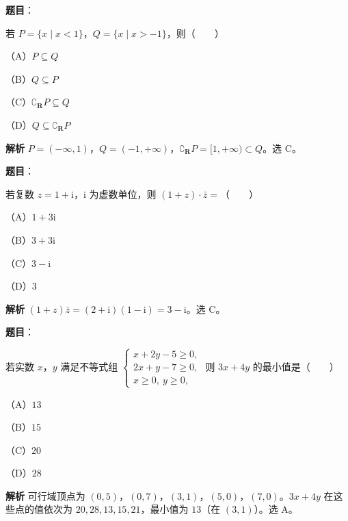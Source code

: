 
\begin{answer}

\textbf{题目}：

若 $P=\{x\mid x<1\}$，$Q=\{x\mid x>-1\}$，则\mbox{（　　）}

（A）$P\subseteq Q$

（B）$Q\subseteq P$

（C）$\complement_{\mathbf R}P\subseteq Q$

（D）$Q\subseteq\complement_{\mathbf R}P$

\textbf{解析}
$P=(-\infty,1)$，$Q=(-1,+\infty)$，$\complement_{\mathbf R}P=[1,+\infty)\subset Q$。选 C。


\end{answer}
\begin{answer}

\textbf{题目}：

若复数 $z=1+\mathrm i$，$\mathrm i$ 为虚数单位，则 $(1+z)\cdot\bar z=$\mbox{（　　）}

（A）$1+3\mathrm i$

（B）$3+3\mathrm i$

（C）$3-\mathrm i$

（D）$3$

\textbf{解析}
$(1+z)\bar z=(2+\mathrm i)(1-\mathrm i)=3-\mathrm i$。选 C。


\end{answer}
\begin{answer}

\textbf{题目}：

若实数 $x$，$y$ 满足不等式组 $\begin{cases}x+2y-5\geqslant0,\\2x+y-7\geqslant0,\\x\geqslant0,\ y\geqslant0,\end{cases}$ 则 $3x+4y$ 的最小值是\mbox{（　　）}

（A）$13$

（B）$15$

（C）$20$

（D）$28$

\textbf{解析}
可行域顶点为 $(0,5)$，$(0,7)$，$(3,1)$，$(5,0)$，$(7,0)$。$3x+4y$ 在这些点的值依次为 $20,28,13,15,21$，最小值为 $13$（在 $(3,1)$）。选 A。


\end{answer}
